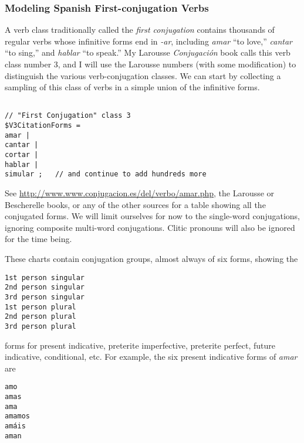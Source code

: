 \subsubsection{Modeling Spanish First-conjugation Verbs}

A verb class traditionally called the \emph{first conjugation}
contains thousands of regular verbs whose
infinitive forms end in \emph{-ar}, including \emph{amar} ``to love,''
\emph{cantar} ``to sing,'' and \emph{hablar} ``to speak.''  My Larousse
\emph{Conjugación} book
calls this verb class number 3, and I will use the Larousse numbers
(with some modification)
to distinguish the various verb-conjugation classes.  We can start
by collecting a sampling of this class of verbs in a simple union of the
infinitive forms.

\begin{Verbatim}

// "First Conjugation" class 3
$V3CitationForms =
amar |
cantar |
cortar |
hablar |
simular ;	// and continue to add hundreds more
\end{Verbatim}

\noindent
See \url{http://www.www.conjugacion.es/del/verbo/amar.php}, the
Larousse or Bescherelle books, or any of the other sources for a table
showing all the conjugated forms.  We will limit ourselves for now to the
single-word conjugations, ignoring composite multi-word conjugations.
Clitic
pronouns will also be ignored for the time being. 

These charts contain conjugation groups, almost always of six forms,
showing the

\begin{Verbatim}
1st person singular
2nd person singular
3rd person singular
1st person plural
2nd person plural
3rd person plural
\end{Verbatim}

\noindent
forms for present indicative, preterite imperfective, preterite perfect,
future indicative, conditional, etc.  For example, the six present indicative
forms of \emph{amar} are


\begin{Verbatim}
amo
amas
ama
amamos
amáis
aman
\end{Verbatim}

